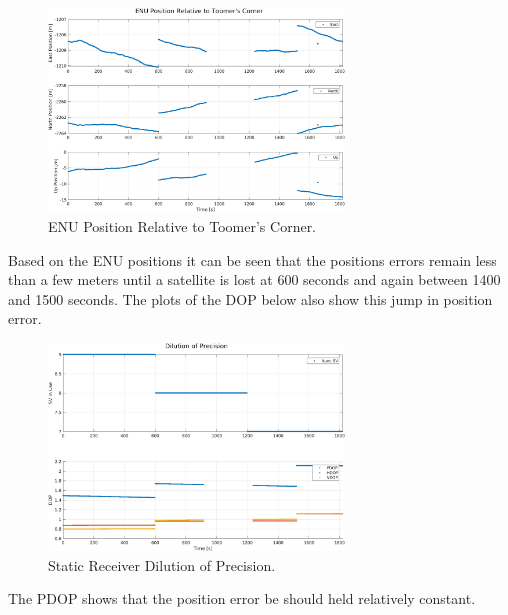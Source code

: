 \documentclass[11pt]{article}
\begin{document}
\begin{enumerate}[label=\textbf{\arabic*.}]
  \begin{figure}[H]
    \centering
    \includegraphics[width=0.7\textwidth]{static_pos_enu.png}
    \caption{ENU Position Relative to Toomer's Corner.}
  \end{figure}
  Based on the ENU positions it can be seen that the positions errors remain 
  less than a few meters until a satellite is lost at 600 seconds and again between 
  1400 and 1500 seconds. The plots of the DOP below also show this jump in position error.
  \begin{figure}[H]
    \centering
    \includegraphics[width=0.7\textwidth]{static_dop.png}
    \caption{Static Receiver Dilution of Precision.}
  \end{figure}
  The PDOP shows that the position error be should held relatively constant. \\


\end{enumerate}
\end{document}
